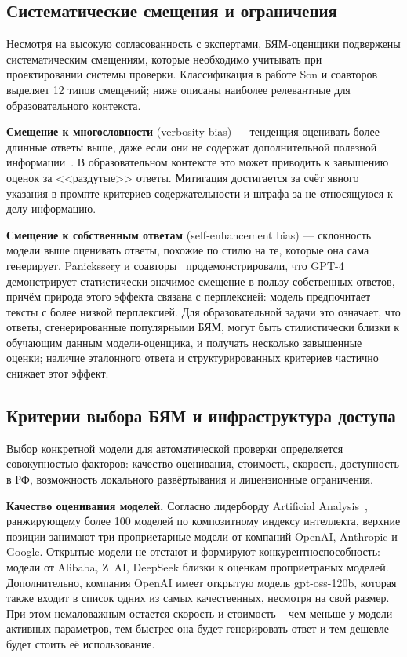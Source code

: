 \subsection{Систематические смещения и ограничения}

Несмотря на высокую согласованность с экспертами, БЯМ-оценщики подвержены систематическим смещениям, которые необходимо учитывать при проектировании системы проверки. Классификация в работе Son и соавторов~\cite{son2024calm} выделяет 12 типов смещений; ниже описаны наиболее релевантные для образовательного контекста.

\textbf{Смещение к многословности} (verbosity bias) --- тенденция оценивать более длинные ответы выше, даже если они не содержат дополнительной полезной информации~\cite{zheng2023judging, son2024calm}. В образовательном контексте это может приводить к завышению оценок за <<раздутые>> ответы. Митигация достигается за счёт явного указания в промпте критериев содержательности и штрафа за не относящуюся к делу информацию.

\textbf{Смещение к собственным ответам} (self-enhancement bias) --- склонность модели выше оценивать ответы, похожие по стилю на те, которые она сама генерирует. Panickssery и соавторы~\cite{panickssery2024selfpreference} продемонстрировали, что GPT-4 демонстрирует статистически значимое смещение в пользу собственных ответов, причём природа этого эффекта связана с перплексией: модель предпочитает тексты с более низкой перплексией. Для образовательной задачи это означает, что ответы, сгенерированные популярными БЯМ, могут быть стилистически близки к обучающим данным модели-оценщика, и получать несколько завышенные оценки; наличие эталонного ответа и структурированных критериев частично снижает этот эффект.

\subsection{Критерии выбора БЯМ и инфраструктура доступа}

Выбор конкретной модели для автоматической проверки определяется совокупностью факторов: качество оценивания, стоимость, скорость, доступность в РФ, возможность локального развёртывания и лицензионные ограничения.

\textbf{Качество оценивания моделей.} Согласно лидерборду Artificial Analysis~\cite{artificialanalysis2026}, ранжирующему более 100 моделей по композитному индексу интеллекта, верхние позиции занимают три проприетарные модели от компаний OpenAI, Anthropic и Google.
Открытые модели не отстают и формируют конкурентноспособность: модели от Alibaba, Z~AI, DeepSeek близки к оценкам проприетраных моделей. Дополнительно, компания OpenAI имеет открытую модель gpt-oss-120b, которая также входит в список одних из самых качественных, несмотря на свой размер.
При этом немаловажным остается скорость и стоимость -- чем меньше у модели активных параметров, тем быстрее она будет генерировать ответ и тем дешевле будет стоить её использование.

